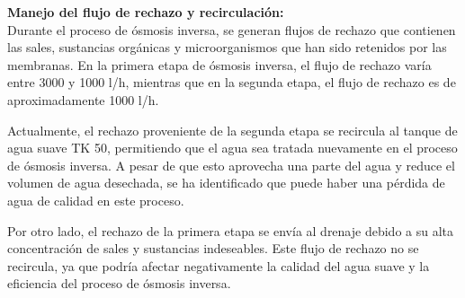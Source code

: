 \textbf{Manejo del flujo de rechazo y recirculación:}\\
Durante el proceso de ósmosis inversa, se generan flujos de rechazo que contienen las sales, sustancias orgánicas y microorganismos que han sido retenidos por las membranas. En la primera etapa de ósmosis inversa, el flujo de rechazo varía entre 3000 y 1000 l/h, mientras que en la segunda etapa, el flujo de rechazo es de aproximadamente 1000 l/h.

Actualmente, el rechazo proveniente de la segunda etapa se recircula al tanque de agua suave TK 50, permitiendo que el agua sea tratada nuevamente en el proceso de ósmosis inversa. A pesar de que esto aprovecha una parte del agua y reduce el volumen de agua desechada, se ha identificado que puede haber una pérdida de agua de calidad en este proceso.

Por otro lado, el rechazo de la primera etapa se envía al drenaje debido a su alta concentración de sales y sustancias indeseables. Este flujo de rechazo no se recircula, ya que podría afectar negativamente la calidad del agua suave y la eficiencia del proceso de ósmosis inversa.


